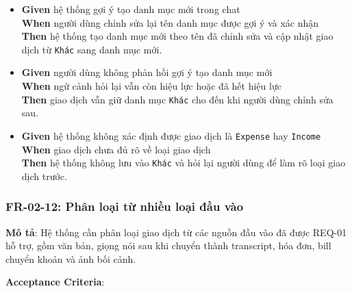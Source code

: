 \begin{itemize}
\item \textbf{Given} hệ thống gợi ý tạo danh mục mới trong chat  \\ \hspace*{1.5em}  \textbf{When} người dùng chỉnh sửa lại tên danh mục được gợi ý và xác nhận  \\ \hspace*{1.5em}  \textbf{Then} hệ thống tạo danh mục mới theo tên đã chỉnh sửa và cập nhật giao dịch từ \texttt{Khác} sang danh mục mới.
\item \textbf{Given} người dùng không phản hồi gợi ý tạo danh mục mới  \\ \hspace*{1.5em}  \textbf{When} ngữ cảnh hỏi lại vẫn còn hiệu lực hoặc đã hết hiệu lực  \\ \hspace*{1.5em}  \textbf{Then} giao dịch vẫn giữ danh mục \texttt{Khác} cho đến khi người dùng chỉnh sửa sau.
\item \textbf{Given} hệ thống không xác định được giao dịch là \texttt{Expense} hay \texttt{Income}  \\ \hspace*{1.5em}  \textbf{When} giao dịch chưa đủ rõ về loại giao dịch  \\ \hspace*{1.5em}  \textbf{Then} hệ thống không lưu vào \texttt{Khác} và hỏi lại người dùng để làm rõ loại giao dịch trước.
\end{itemize}
\subsubsection{FR-02-12: Phân loại từ nhiều loại đầu vào}

\textbf{Mô tả}: Hệ thống cần phân loại giao dịch từ các nguồn đầu vào đã được REQ-01 hỗ trợ, gồm văn bản, giọng nói sau khi chuyển thành transcript, hóa đơn, bill chuyển khoản và ảnh bối cảnh.



\textbf{Acceptance Criteria}:

